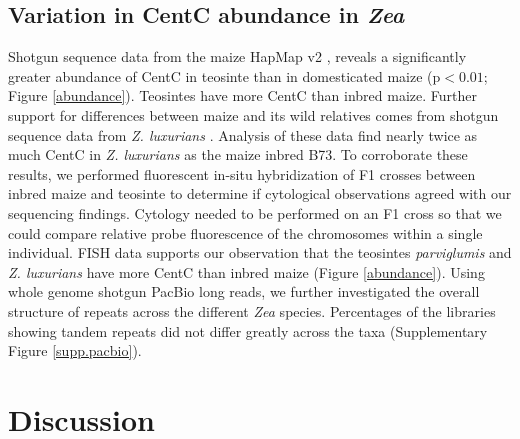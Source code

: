 \subsection*{Variation in CentC abundance in \emph{Zea}}

Shotgun sequence data from the maize HapMap v2 \citep{Chia2012}, reveals a significantly greater abundance of CentC in teosinte than in domesticated maize (p$<0.01$; Figure \ref{abundance}). Teosintes have more CentC than inbred maize.  Further support for differences between maize and its wild relatives comes from shotgun sequence data from \emph{Z. luxurians} \citep{Tenaillon2011}.  Analysis of these data find nearly twice as much CentC in \emph{Z. luxurians} as the maize inbred B73.  To corroborate these results, we performed fluorescent in-situ hybridization of F1 crosses between inbred maize and teosinte to determine if cytological observations agreed with our sequencing findings.  Cytology needed to be performed on an F1 cross so that we could compare relative probe fluorescence of the chromosomes within a single individual.  FISH data supports our observation that the teosintes \emph{parviglumis} and \emph{Z. luxurians} have more CentC than inbred maize (Figure \ref{abundance}).  Using whole genome shotgun PacBio long reads, we further investigated the overall structure of repeats across the different \emph{Zea} species.  Percentages of the libraries showing tandem repeats did not differ greatly across the taxa (Supplementary Figure \ref{supp.pacbio}).

\section*{Discussion}
\label{discussion}



